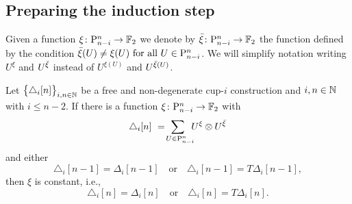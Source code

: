 \subsection{Preparing the induction step}

\begin{notation}
	Given a function $\xi \colon \mathrm{P}_{n-i}^n \to {\mathbb{F}_2}$ we denote by ${\bar{\xi}} \colon \mathrm{P}_{n-i}^n \to {\mathbb{F}_2}$ the function defined by the condition ${\bar{\xi}}(U) \neq \xi(U) \text{ for all } U \in \mathrm{P}_{n-i}^n$.
	We will simplify notation writing $U^\xi$ and $U^{{\bar{\xi}}}$ instead of $U^{\xi(U)}$ and $U^{{\bar{\xi}}(U)}$.
\end{notation}

\begin{lemma} \label{l:first nail}
	Let $\big\{ \triangle_i [n] \big\}_{i,n\in\mathbb{N}}$ be a free and non-degenerate \mbox{cup-$i$} construction and $i,n \in \mathbb{N}$ with $i \leq n-2$.
	If there is a function $\xi \colon \mathrm{P}_{n-i}^n \to {\mathbb{F}_2}$ with
	\begin{equation} \label{e:assumed identity with xi and barxi}
	\triangle_i [n] \ = \!
	\sum_{U \in \mathrm{P}_{n-i}^n \kern-5pt} U^{\xi} \otimes U^{{\bar{\xi}}}
	\end{equation}
	and either
	\[
	\triangle_i [n-1] = \Delta_i [n-1]
	\quad \text{or} \quad
	\triangle_i [n-1] = T\Delta_i [n-1],
	\]
	then $\xi$ is constant, i.e.,
	\[
	\triangle_i [n] = \Delta_i [n]
	\quad \text{or} \quad
	\triangle_i [n] = T \Delta_i [n].
	\]
\end{lemma}

